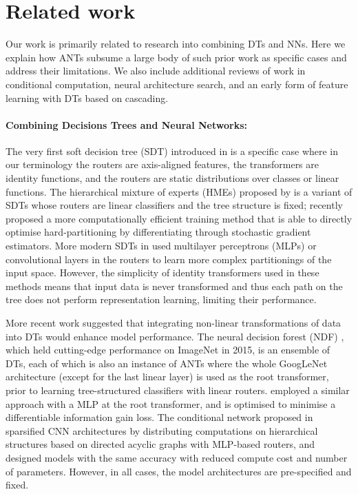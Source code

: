 \section{Related work}\label{sec:relatedwork}

Our work is primarily related to research into combining DTs and NNs. Here we explain how ANTs subsume a large body of such prior work as specific cases and address their limitations. We also include additional reviews of work in conditional computation, neural architecture search, and an early form of feature learning with DTs based on cascading. 

\paragraph{Combining Decisions Trees and Neural Networks:}
The very first soft decision tree (SDT) introduced in \cite{suarez1999globally} is a specific case where in our terminology the routers are axis-aligned features, the transformers are identity functions, and the routers are static distributions over classes or linear functions. The hierarchical mixture of experts (HMEs) proposed by \cite{jordan1994hierarchical} is a variant of SDTs whose routers are linear classifiers and the tree structure is fixed; \cite{leon2015policy} recently proposed a more computationally efficient training method that is able to directly optimise hard-partitioning by differentiating through stochastic gradient estimators. More modern SDTs in \cite{rota2014neural,laptev2014convolutional,frosst2017distilling} used multilayer perceptrons (MLPs) or convolutional layers in the routers to learn more complex partitionings of the input space. However, the simplicity of identity transformers used in these methods means that input data is never transformed and thus each path on the tree does not perform representation learning, limiting their performance.

More recent work suggested that integrating non-linear transformations of data into DTs would enhance model performance. The neural decision forest (NDF) \cite{kontschieder2015deep}, which held cutting-edge performance on ImageNet \cite{deng2009imagenet} in 2015, is an ensemble of DTs, each of which is also an instance of ANTs where the whole GoogLeNet architecture \cite{szegedy2015going} (except for the last linear layer) is used as the root transformer, prior to learning tree-structured classifiers with linear routers. \cite{xiao2017ndt} employed a similar approach with a MLP at the root transformer, and is optimised to minimise a differentiable information gain loss. The conditional network proposed in \cite{ioannou2016decision} sparsified CNN architectures by distributing computations on hierarchical structures based on directed acyclic graphs with MLP-based routers, and designed models with the same accuracy with reduced compute cost and number of parameters. However, in all cases, the model architectures are pre-specified and fixed.

